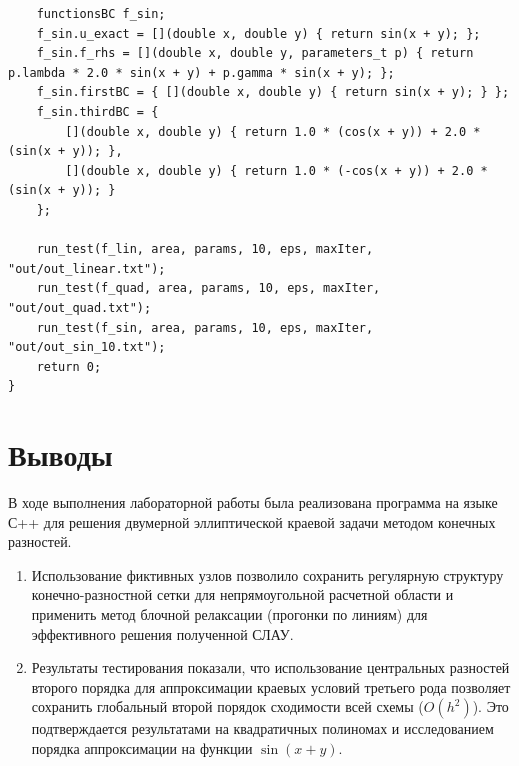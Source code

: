 \documentclass[a4paper,12pt]{article}
\begin{document}
\begin{lstlisting}
    functionsBC f_sin;
    f_sin.u_exact = [](double x, double y) { return sin(x + y); };
    f_sin.f_rhs = [](double x, double y, parameters_t p) { return p.lambda * 2.0 * sin(x + y) + p.gamma * sin(x + y); };
    f_sin.firstBC = { [](double x, double y) { return sin(x + y); } };
    f_sin.thirdBC = { 
        [](double x, double y) { return 1.0 * (cos(x + y)) + 2.0 * (sin(x + y)); },
        [](double x, double y) { return 1.0 * (-cos(x + y)) + 2.0 * (sin(x + y)); }
    };

    run_test(f_lin, area, params, 10, eps, maxIter, "out/out_linear.txt");
    run_test(f_quad, area, params, 10, eps, maxIter, "out/out_quad.txt");
    run_test(f_sin, area, params, 10, eps, maxIter, "out/out_sin_10.txt");
    return 0;
}
\end{lstlisting}

\section{Выводы}
В ходе выполнения лабораторной работы была реализована программа на языке С++ для решения двумерной эллиптической краевой задачи методом конечных разностей. 
\begin{enumerate}
    \item Использование фиктивных узлов позволило сохранить регулярную структуру конечно-разностной сетки для непрямоугольной расчетной области и применить метод блочной релаксации (прогонки по линиям) для эффективного решения полученной СЛАУ.
    \item Результаты тестирования показали, что использование центральных разностей второго порядка для аппроксимации краевых условий третьего рода позволяет сохранить глобальный второй порядок сходимости всей схемы ($O(h^2)$). Это подтверждается результатами на квадратичных полиномах и исследованием порядка аппроксимации на функции $\sin(x+y)$.
\end{enumerate}
\end{document}
